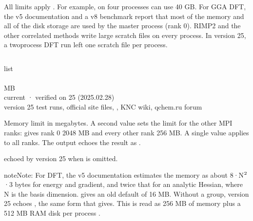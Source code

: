 \documentclass[letterpaper,10pt,english,openany,oneside]{sphinxmanual}
\begin{document}
\sphinxAtStartPar
All limits apply . For example,  on four processes can use 40 GB. For GGA DFT, the
v5 documentation and a v8 benchmark report that most of the memory and all of the disk storage are used by the
master process (rank 0). RI\sphinxhyphen{}MP2 and the other correlated methods write large scratch files on every process.
In version 25, a two\sphinxhyphen{}process DFT run left one scratch file per process.


\subsection{}
\label{\detokenize{reference/system:memory}}\label{\detokenize{reference/system:system-memory}}
\ignorespaces 
\sphinxAtStartPar
{} list\\
 \\
 MB\\
 current · verified on 25 (2025.02.28)\\
 version 25 test runs, official site files, , KNC wiki, qchem.ru forum

\sphinxAtStartPar
Memory limit in megabytes. A second value sets the limit for the other MPI ranks:  gives rank 0
2048 MB and every other rank 256 MB. A single value applies to all ranks. The output echoes the result as
.

\sphinxAtStartPar
{} echoed by version 25 when  is omitted.

\begin{sphinxadmonition}{note}{Note:}
\sphinxAtStartPar
For DFT, the v5 documentation estimates the memory as about 8·N\(\sp{\text{2}}\)·3 bytes for energy and gradient, and twice that
for an analytic Hessian, where N is the basis dimension.  gives an old default of 16 MB.
Without a  group, version 25 echoes , the same form that
 gives. This is read as 256 MB of memory plus a 512 MB RAM disk per process
.
\end{sphinxadmonition}
\end{document}
